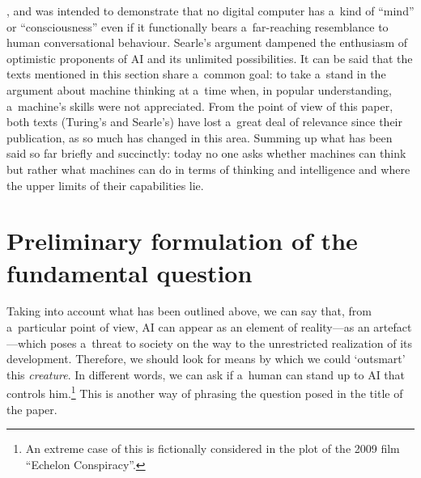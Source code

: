 \parencite*[][]{searle_minds_1980}, %
 and was intended to demonstrate that no digital computer has a~kind of ``mind'' or ``consciousness'' even if it functionally bears a~far-reaching resemblance to human conversational behaviour. Searle's argument dampened the enthusiasm of optimistic proponents of AI and its unlimited possibilities. It can be said that the texts mentioned in this section share a~common goal: to take a~stand in the argument about machine thinking at a~time when, in popular understanding, a~machine's skills were not appreciated. From the point of view of this paper, both texts (Turing's and Searle's) have lost a~great deal of relevance since their publication, as so much has changed in this area. Summing up what has been said so far briefly and succinctly: today no one asks whether machines can think but rather what machines can do in terms of thinking and intelligence and where the upper limits of their capabilities lie.

\section{Preliminary formulation of the fundamental question}
Taking into account what has been outlined above, we can say that, from a~particular point of view, AI can appear as an element of reality—as an artefact—which poses a~threat to society on the way to the unrestricted realization of its development. Therefore, we should look for means by which we could ‘outsmart' this \textit{creature}. In different words, we can ask if a~human can stand up to AI that controls him.\footnote{ An extreme case of this is fictionally considered in the plot of the 2009 film ``Echelon Conspiracy''.} This is another way of phrasing the question posed in the title of the paper.

